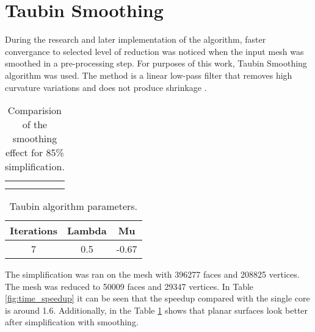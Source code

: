 \newpage
\section{Taubin Smoothing}

During the research and later implementation of the algorithm, faster convergance to selected level of reduction was noticed when the input mesh was smoothed in a pre-processing step. For purposes of this work, Taubin Smoothing algorithm was used. The method is a linear low-pass filter that removes high curvature variations and does not produce shrinkage \cite{taubin95}.

\begin{center}
  	\begin{table}[h!]
  	\begin{center}
  	\begin{tabular}{cc}
	\begin{subfigure}{1\textwidth}\centering\includegraphics
		[width=0.8\columnwidth]{smooth}\caption{Simplification with smoothing}\label{smooth}\end{subfigure}\\
	\begin{subfigure}{1\textwidth}\centering\includegraphics
		[width=0.8\columnwidth]{non_smooth}\caption{Simplification without smoothing}\label{non_smooth}\end{subfigure}
	\end{tabular}
	\caption{Comparision of the smoothing effect for 85\% simplification.}
  	\label{tab:smoothing_effect}
  	\end{center}
	\end{table}
\end{center}

\begin{table}[h!]
\centering
\begin{tabular}{ |c|c|c| } 
 \hline
 Iterations & Lambda & Mu\\
 \hline
 7 & 0.5 & -0.67\\ 
 \hline
\end{tabular}
\caption{Taubin algorithm parameters.}
\end{table}
\newpage
The simplification was ran on the mesh with 396277 faces and 208825 vertices. The mesh was reduced to 50009 faces and 29347 vertices. In Table \ref{fig:time_speedup} it can be seen that the speedup compared with the single core is around 1.6. Additionally, in the Table \ref{tab:smoothing_effect} shows that planar surfaces look better after simplification with smoothing.

